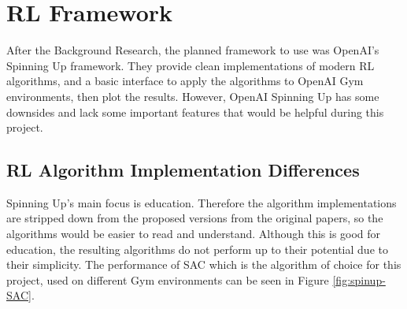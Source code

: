 \section{RL Framework}
After the Background Research, the planned framework to use was OpenAI's Spinning Up framework. They provide clean implementations of modern RL algorithms, and a basic interface to apply the algorithms to OpenAI Gym environments, then plot the results. However, OpenAI Spinning Up has some downsides and lack some important features that would be helpful during this project.

\subsection{RL Algorithm Implementation Differences} \label{RLF:imp-diff}
Spinning Up's main focus is education. Therefore the algorithm implementations are stripped down from the proposed versions from the original papers, so the algorithms would be easier to read and understand. Although this is good for education, the resulting algorithms do not perform up to their potential due to their simplicity. The performance of SAC which is the algorithm of choice for this project, used on different Gym environments can be seen in Figure \ref{fig:spinup-SAC}.

